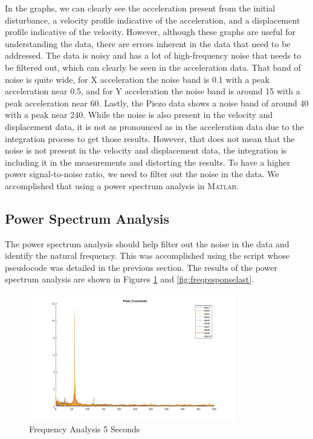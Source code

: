 \documentclass{article}
\begin{document}
In the graphs, we can clearly see the acceleration present from the initial disturbance, a velocity profile indicative of the acceleration, and a displacement profile indicative of the velocity. However, although these graphs are useful for understanding the data, there are errors inherent in the data that need to be addressed. The data is noisy and has a lot of high-frequency noise that needs to be filtered out, which can clearly be seen in the acceleration data. That band of noise is quite wide, for X acceleration the noise band is 0.1 with a peak acceleration near 0.5, and for Y acceleration the noise band is around 15 with a peak acceleration near 60. Lastly, the Piezo data shows a noise band of around 40 with a peak near 240. While the noise is also present in the velocity and displacement data, it is not as pronounced as in the acceleration data due to the integration process to get those results. However, that does not mean that the noise is not present in the velocity and displacement data, the integration is including it in the measurements and distorting the results. To have a higher power signal-to-noise ratio, we need to filter out the noise in the data. We accomplished that using a power spectrum analysis in \textsc{Matlab}.

\subsection{Power Spectrum Analysis}

The power spectrum analysis should help filter out the noise in the data and identify the natural frequency. This was accomplished using the script whose pseudocode was detailed in the previous section. The results of the power spectrum analysis are shown in Figures \ref{fig:freqresponse5} and \ref{fig:freqresponselast}.

\begin{figure}[H]
    \centering
    \includegraphics[width = 0.8\textwidth]{lab6images/frequencyanalysis5second.png}
    \caption{Frequency Analysis 5 Seconds}
    \label{fig:freqresponse5}
\end{figure}
\end{document}
